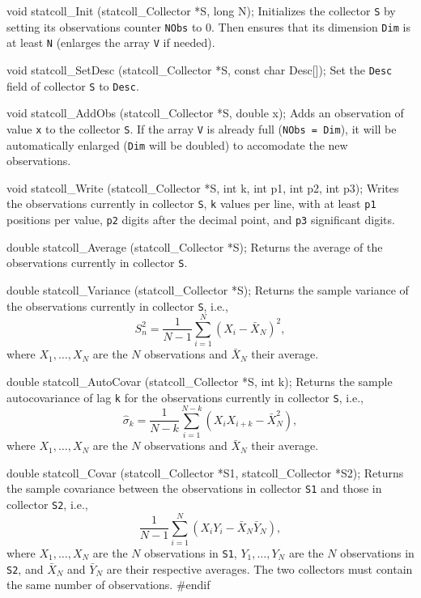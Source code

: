 void statcoll_Init (statcoll_Collector *S, long N);
\endcode
 \tab
 Initializes the collector {\tt S} by setting its observations counter 
 {\tt NObs} to 0.  Then ensures that its dimension {\tt Dim} 
 is at least {\tt N} (enlarges the array {\tt V} if needed).
\endtab
\code


void statcoll_SetDesc (statcoll_Collector *S, const char Desc[]);
\endcode
 \tab
 Set the {\tt Desc} field of collector {\tt S} to {\tt Desc}.
\endtab
\code


void statcoll_AddObs (statcoll_Collector *S, double x);
\endcode
\tab Adds an observation of value {\tt x} to the collector {\tt S}.
 If the array {\tt V} is already full ({\tt NObs = Dim}),
 it will be automatically enlarged ({\tt Dim} will be doubled)
 to accomodate the new observations.
\endtab
\code


void statcoll_Write (statcoll_Collector *S, int k, int p1, int p2, int p3);
\endcode
 \tab 
  Writes the observations currently in collector {\tt S},
  {\tt k} values per line, with at least {\tt p1} positions per
  value, {\tt p2} digits after the decimal point,
  and {\tt p3} significant digits.
 \endtab
\code


double statcoll_Average (statcoll_Collector *S);
\endcode
 \tab 
  Returns the average of the observations currently in collector {\tt S}.
 \endtab
\code


double statcoll_Variance (statcoll_Collector *S);
\endcode
 \tab 
  Returns the sample variance of the observations currently 
  in collector {\tt S}, i.e., 
 \[
   S_n^2 = \frac{1}{N-1} \sum_{i=1}^N (X_i - \bar X_N)^2,
 \]
 where $X_1,\dots,X_N$ are the $N$ observations and $\bar X_N$ their
 average.
 \endtab
\code


double statcoll_AutoCovar (statcoll_Collector *S, int k);
\endcode
 \tab
  Returns the sample autocovariance of lag {\tt k} for the 
  observations currently in collector {\tt S}, i.e., 
 \[
   \hat\sigma_k = \frac{1}{N-k} \sum_{i=1}^{N-k} (X_i X_{i+k} - \bar X_N^2),
 \]
 where $X_1,\dots,X_N$ are the $N$ observations and $\bar X_N$ their
 average.
 \endtab
\code


double statcoll_Covar (statcoll_Collector *S1, statcoll_Collector *S2);
\endcode
 \tab
  Returns the sample covariance between the observations 
  in collector {\tt S1} and those in collector {\tt S2}, i.e.,
 \[
   \frac{1}{N-1} \sum_{i=1}^{N} (X_i Y_i - \bar X_N \bar Y_N),
 \]
 where $X_1,\dots,X_N$ are the $N$ observations in {\tt S1}, 
 $Y_1,\dots,Y_N$ are the $N$ observations in {\tt S2},
 and $\bar X_N$ and $\bar Y_N$ are their respective averages.
 The two collectors must contain the same number of observations.
 \endtab
\code
\hide
#endif
\endhide
\endcode

